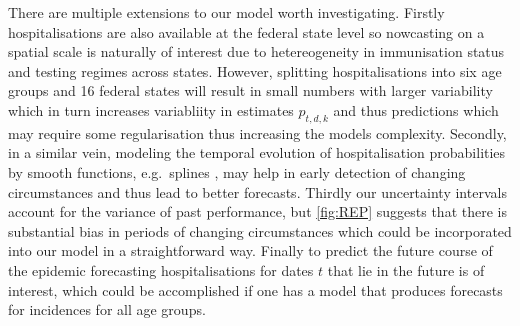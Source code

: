 There are multiple extensions to our model worth investigating. Firstly
hospitalisations are also available at the federal state level so
nowcasting on a spatial scale is naturally of interest due to
hetereogeneity in immunisation status and testing regimes across states.
However, splitting hospitalisations into six age groups and 16 federal
states will result in small numbers with larger variability which in
turn increases variabliity in estimates \(p_{t,d,k}\) and thus
predictions which may require some regularisation thus increasing the
models complexity. Secondly, in a similar vein, modeling the temporal
evolution of hospitalisation probabilities by smooth functions,
e.g.~splines
\cite{vandeKassteele2019Nowcasting,Schneble2021Nowcasting}, may help
in early detection of changing circumstances and thus lead to better
forecasts. Thirdly our uncertainty intervals account for the variance of
past performance, but \cref{fig:REP} suggests that there is
substantial bias in periods of changing circumstances which could be
incorporated into our model in a straightforward way. Finally to predict
the future course of the epidemic forecasting hospitalisations for dates
\(t\) that lie in the future is of interest, which could be accomplished
if one has a model that produces forecasts for incidences for all age
groups.
